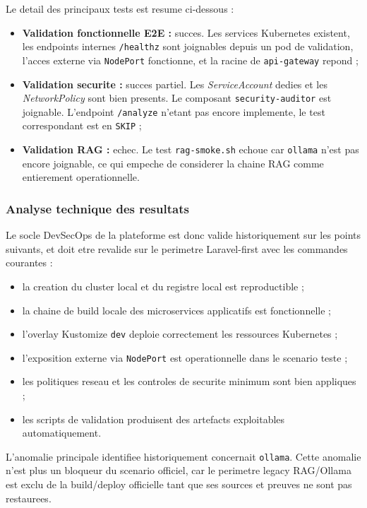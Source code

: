 Le detail des principaux tests est resume ci-dessous :

\begin{itemize}
  \item \textbf{Validation fonctionnelle E2E :} succes. Les services Kubernetes existent, les endpoints internes \texttt{/healthz} sont joignables depuis un pod de validation, l'acces externe via \texttt{NodePort} fonctionne, et la racine de \texttt{api-gateway} repond ;
  \item \textbf{Validation securite :} succes partiel. Les \textit{ServiceAccount} dedies et les \textit{NetworkPolicy} sont bien presents. Le composant \texttt{security-auditor} est joignable. L'endpoint \texttt{/analyze} n'etant pas encore implemente, le test correspondant est en \texttt{SKIP} ;
  \item \textbf{Validation RAG :} echec. Le test \texttt{rag-smoke.sh} echoue car \texttt{ollama} n'est pas encore joignable, ce qui empeche de considerer la chaine RAG comme entierement operationnelle.
\end{itemize}

\subsubsection{Analyse technique des resultats}

Le socle DevSecOps de la plateforme est donc valide historiquement sur les points suivants, et doit etre revalide sur le perimetre Laravel-first avec les commandes courantes :

\begin{itemize}
  \item la creation du cluster local et du registre local est reproductible ;
  \item la chaine de build locale des microservices applicatifs est fonctionnelle ;
  \item l'overlay Kustomize \texttt{dev} deploie correctement les ressources Kubernetes ;
  \item l'exposition externe via \texttt{NodePort} est operationnelle dans le scenario teste ;
  \item les politiques reseau et les controles de securite minimum sont bien appliques ;
  \item les scripts de validation produisent des artefacts exploitables automatiquement.
\end{itemize}

L'anomalie principale identifiee historiquement concernait \texttt{ollama}. Cette anomalie n'est plus un bloqueur du scenario officiel, car le perimetre legacy RAG/Ollama est exclu de la build/deploy officielle tant que ses sources et preuves ne sont pas restaurees.

